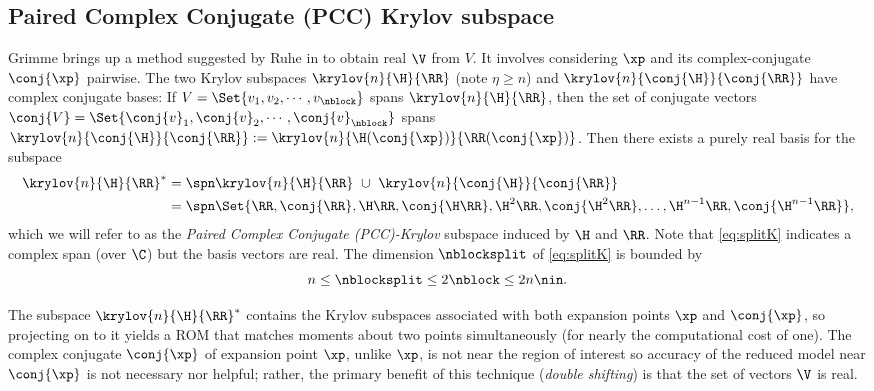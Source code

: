 \subsection{Paired Complex Conjugate (PCC) Krylov subspace}
Grimme \cite{grimme97} brings up a method suggested by Ruhe in \cite{ruhe1994rational}
to obtain real $\V$ from $V$.  It involves considering  $\xp$ and its complex-conjugate $\conj{\xp}$ pairwise.  The two Krylov subspaces $\krylov{n}{\H}{\RR}$
(note $\eta\geq n$) and  $\krylov{n}{\conj{\H}}{\conj{\RR}}$ have complex conjugate bases: If
 $V = \Set{v_1, v_2, \cdots,v_\nblock}$ spans
$\krylov{n}{\H}{\RR}$, then the set of conjugate vectors
$\conj{V}= \Set{\conj{v}_1, \conj{v}_2, \cdots,\conj{v}_\nblock}$ spans
$\krylov{n}{\conj{\H}}{\conj{\RR}}:=\krylov{n}{\H(\conj{\xp})}{\RR(\conj{\xp})}$.
Then there exists a purely real basis for the subspace
\begin{equation}
	\begin{aligned}
	\krylov{n}{\H}{\RR}^*
	&= \spn\krylov{n}{\H}{\RR} \ \cup\ \krylov{n}{\conj{\H}}{\conj{\RR}}\\
	&= \spn\Set{\RR, \conj{\RR}, \H \RR, \conj{\H \RR}, \H^2\RR, \conj{\H^2\RR},
		\ldots,\H^{n-1}\RR, \conj{\H^{n-1}\RR} },
	\end{aligned}
\label{eq:splitK}
\end{equation}
which we will refer to as the \emph{Paired Complex Conjugate (PCC)-Krylov}  subspace induced
by $\H$ and $\RR$. Note that \eqref{eq:splitK} indicates a complex span (over $\C$)
but the basis vectors are real. The dimension $\nblocksplit$ of \eqref{eq:splitK} is bounded
by
\begin{equation}
n\leq\nblocksplit\leq 2\nblock\leq 2n\nin.
\label{eq:basissizes}
\end{equation}


The subspace $\krylov{n}{\H}{\RR}^*$ contains the Krylov subspaces associated with both
expansion points
$\xp$ and $\conj{\xp}$, so projecting on to it yields a ROM that matches moments about two points
simultaneously (for nearly the computational cost of one). The complex conjugate
$\conj{\xp}$ of expansion point $\xp$, unlike $\xp$, is not near the region of interest
so accuracy of the reduced model near $\conj{\xp}$ is not necessary nor helpful;
rather, the primary benefit of this
technique (\emph{double shifting}) is that the set
of vectors $\V$ is real.

